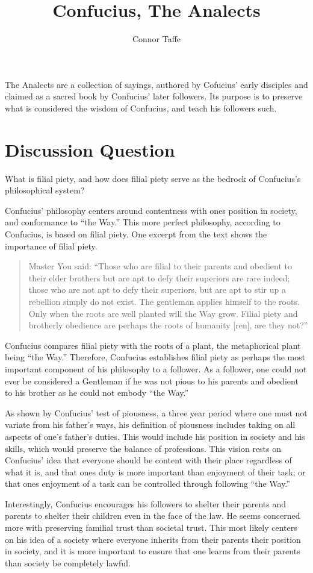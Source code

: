 \documentclass[man,11pt,a4paper, biblatex]{apa6}
\title{Confucius, The Analects}
\affiliation{University of Arkansas at Little Rock}
\author{Connor Taffe}
\begin{document}
  \maketitle

  The Analects are a collection of sayings, authored by Cofucius' early disciples and claimed as a sacred book by Confucius' later followers. Its purpose is to preserve what is considered the wisdom of Confucius, and teach his followers such.

  \section{Discussion Question}
  What is filial piety, and how does filial piety serve as the bedrock of Confucius’s philosophical system?

  Confucius' philosophy centers around contentness with ones position in society, and conformance to ``the Way.'' This more perfect philosophy, according to Confucius, is based on filial piety. One excerpt from the text shows the importance of filial piety.

  \begin{quote}
    Master You said: “Those who are filial to their parents and obedient to their elder brothers but are apt to defy their superiors are rare indeed; those who are not apt to defy their superiors, but are apt to stir up a rebellion simply do not exist. The gentleman applies himself to the roots. Only when the roots are well planted will the Way grow. Filial piety and brotherly obedience are perhaps the roots of humanity [ren], are they not?”
  \end{quote}

  Confucius compares filial piety with the roots of a plant, the metaphorical plant being ``the Way.'' Therefore, Confucius establishes filial piety as perhaps the most important component of his philosophy to a follower. As a follower, one could not ever be considered a Gentleman if he was not pious to his parents and obedient to his brother as he could not embody ``the Way.''

  As shown by Confucius' test of piousness, a three year period where one must not variate from his father's ways, his definition of piousness includes taking on all aspects of one's father's duties. This would include his position in society and his skills, which would preserve the balance of professions. This vision rests on Confucius' idea that everyone should be content with their place regardless of what it is, and that ones duty is more important than enjoyment of their task; or that ones enjoyment of a task can be controlled through following ``the Way.''

  Interestingly, Confucius encourages his followers to shelter their parents and parents to shelter their children even in the face of the law. He seems concerned more with preserving familial trust than societal trust. This most likely centers on his idea of a society where everyone inherits from their parents their position in society, and it is more important to ensure that one learns from their parents than society be completely lawful.
\end{document}
